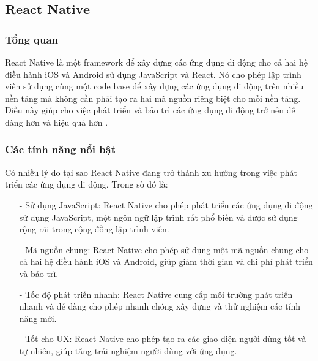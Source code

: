 \subsection{React Native}
\subsubsection{Tổng quan}
\hspace*{1cm} React Native là một framework để xây dựng các ứng dụng di động cho cả hai hệ điều hành iOS và Android sử dụng JavaScript và React. Nó cho phép lập trình viên sử dụng cùng một code base để xây dựng các ứng dụng di động trên nhiều nền tảng mà không cần phải tạo ra hai mã nguồn riêng biệt cho mỗi nền tảng. Điều này giúp cho việc phát triển và bảo trì các ứng dụng di động trở nên dễ dàng hơn và hiệu quả hơn \cite{rn}.
\subsubsection{Các tính năng nổi bật}
Có nhiều lý do tại sao React Native đang trở thành xu hướng trong việc phát triển các ứng dụng di động. Trong số đó là:
\begin{itemize}
    \item[-] Sử dụng JavaScript: React Native cho phép phát triển các ứng dụng di động sử dụng JavaScript, một ngôn ngữ lập trình rất phổ biến và được sử dụng rộng rãi trong cộng đồng lập trình viên.
    \item[-] Mã nguồn chung: React Native cho phép sử dụng một mã nguồn chung cho cả hai hệ điều hành iOS và Android, giúp giảm thời gian và chi phí phát triển và bảo trì.
    \item[-] Tốc độ phát triển nhanh: React Native cung cấp môi trường phát triển nhanh và dễ dàng cho phép nhanh chóng xây dựng và thử nghiệm các tính năng mới.
    \item[-] Tốt cho UX: React Native cho phép tạo ra các giao diện người dùng tốt và tự nhiên, giúp tăng trải nghiệm người dùng với ứng dụng.
\end{itemize}

